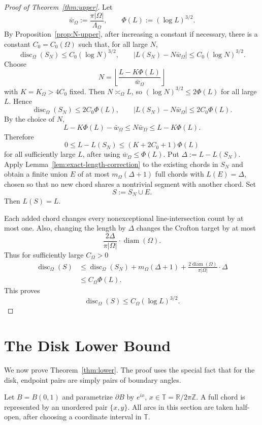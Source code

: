 \documentclass[11pt]{article}
\theoremstyle{definition}
\newcommand{\R}{\mathbb R}
\newcommand{\Z}{\mathbb Z}
\newcommand{\T}{\mathbb T}
\newcommand{\disc}{\operatorname{disc}}
\newcommand{\diam}{\operatorname{diam}}
\begin{document}
\begin{proof}[Proof of Theorem~\ref{thm:upper}]
Let
\[
        \bar w_\Omega:=\frac{\pi|\Omega|}{\Lambda_\Omega},
        \qquad
        \Phi(L):=(\log L)^{3/2}.
\]
By Proposition~\ref{prop:N-upper}, after increasing a constant if necessary, there is a constant $C_0=C_0(\Omega)$ such that, for all large $N$,
\[
        \disc_\Omega(S_N)\le C_0(\log N)^{3/2},
        \qquad
        \left|L(S_N)-N\bar w_\Omega\right|\le C_0(\log N)^{3/2}.
\]
Choose
\[
        N=\left\lfloor \frac{L-K\Phi(L)}{\bar w_\Omega}\right\rfloor
\]
with $K=K_\Omega>4C_0$ fixed. Then $N\asymp_\Omega L$, so $(\log N)^{3/2}\le 2\Phi(L)$ for all large $L$. Hence
\[
        \disc_\Omega(S_N)\le 2C_0\Phi(L),
        \qquad
        \left|L(S_N)-N\bar w_\Omega\right|\le 2C_0\Phi(L).
\]
By the choice of $N$,
\[
        L-K\Phi(L)-\bar w_\Omega\le N\bar w_\Omega\le L-K\Phi(L).
\]
Therefore
\[
        0\le L-L(S_N)\le (K+2C_0+1)\Phi(L)
\]
for all sufficiently large $L$, after using $\bar w_\Omega\le \Phi(L)$. Put $\Delta:=L-L(S_N)$.  Apply Lemma~\ref{lem:exact-length-correction} to the existing chords in $S_N$ and obtain a finite union $E$ of at most $m_\Omega(\Delta+1)$ full chords with $L(E)=\Delta$, chosen so that no new chord shares a nontrivial segment with another chord.  Set
\[
        S:=S_N\cup E.
\]
Then $L(S)=L$.

\bigskip
\noindent
Each added chord changes every nonexceptional line-intersection count by at most one. Also, changing the length by $\Delta$ changes the Crofton target by at most
\[
        \frac{2\Delta}{\pi|\Omega|}\cdot\diam(\Omega).
\]
Thus for sufficiently large $C_\Omega > 0$
\[
\begin{aligned}
        \disc_\Omega(S)
        &\le \disc_\Omega(S_N)+m_\Omega(\Delta+1)+\frac{2\diam(\Omega)}{\pi|\Omega|}\cdot\Delta \\
        &\le C_\Omega\Phi(L).
\end{aligned}
\]
This proves
\[
        \disc_\Omega(S)\le C_\Omega(\log L)^{3/2}.
\]
\end{proof}

\section{The Disk Lower Bound}

We now prove Theorem~\ref{thm:lower}.  The proof uses the special fact that for the disk, endpoint pairs are simply pairs of boundary angles.

\bigskip
\noindent
Let $B=B(0,1)$ and parametrize $\partial B$ by $e^{ix}$, $x\in\T=\R/2\pi\Z$.  A full chord is represented by an unordered pair $\{x,y\}$.  All arcs in this section are taken half-open, after choosing a coordinate interval in $\T$.
\end{document}

